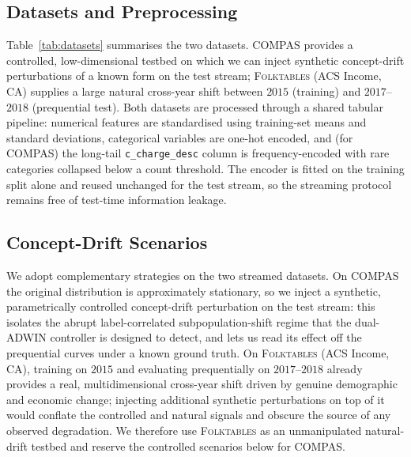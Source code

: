 \documentclass[sigconf,anonymous,review]{acmart}
\begin{document}
\subsection{Datasets and Preprocessing}
\label{sec:method:data}
Table~\ref{tab:datasets} summarises the two datasets. \textsc{COMPAS} provides a controlled, low-dimensional testbed on which we can inject synthetic
concept-drift perturbations of a known form on the test stream; \textsc{Folktables} (ACS Income, CA) supplies a large natural cross-year shift between
$2015$ (training) and $2017$--$2018$ (prequential test). Both datasets are processed through a shared tabular pipeline: numerical features are standardised
using training-set means and standard deviations, categorical variables are one-hot encoded, and (for \textsc{COMPAS}) the long-tail \texttt{c\_charge\_desc}
column is frequency-encoded with rare categories collapsed below a count threshold. The encoder is fitted on the training split alone and reused unchanged
for the test stream, so the streaming protocol remains free of test-time information leakage.

\begin{table}[t]
\centering
\caption{Datasets.}
\label{tab:datasets}
\setlength{\tabcolsep}{1pt}
\end{table}

\subsection{Concept-Drift Scenarios}
\label{sec:method:scenarios}
We adopt complementary strategies on the two streamed datasets. On \textsc{COMPAS} the original distribution is approximately stationary, so we
inject a synthetic, parametrically controlled concept-drift perturbation on the test stream: this isolates the abrupt label-correlated subpopulation-shift
regime that the dual-ADWIN controller is designed to detect, and lets us read its effect off the prequential curves under a known ground truth. On \textsc{Folktables} (ACS Income, CA), training on $2015$ and evaluating prequentially on $2017$--$2018$ already provides a real,
multidimensional cross-year shift driven by genuine demographic and economic change; injecting additional synthetic perturbations on top of it would
conflate the controlled and natural signals and obscure the source of any observed degradation. We therefore use \textsc{Folktables} as an
unmanipulated natural-drift testbed and reserve the controlled scenarios below for \textsc{COMPAS}.
\end{document}
